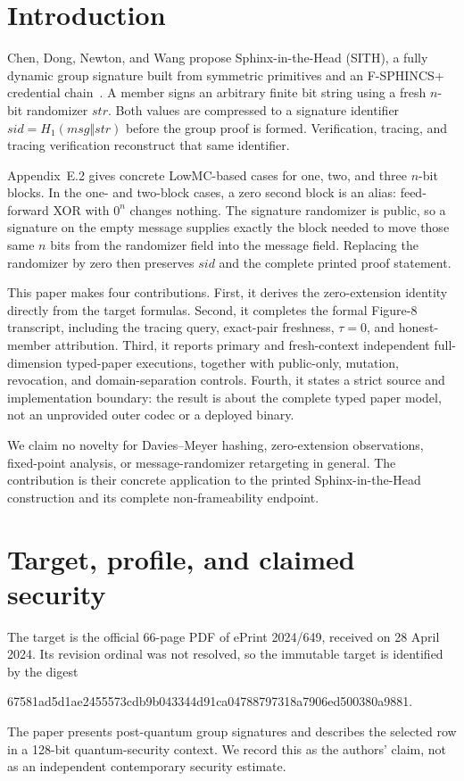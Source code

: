 \documentclass[10pt,a4paper]{article}
\newcommand{\Hone}{H_1}
\newcommand{\sid}{\mathit{sid}}
\newcommand{\strr}{\mathit{str}}
\newcommand{\msg}{\mathit{msg}}
\begin{document}
\section{Introduction}

Chen, Dong, Newton, and Wang propose Sphinx-in-the-Head (SITH), a fully
dynamic group signature built from symmetric primitives and an F-SPHINCS+
credential chain~\cite{chen2024}. A member signs an arbitrary finite bit string
using a fresh $n$-bit randomizer $\strr$. Both values are compressed to a
signature identifier $\sid=\Hone(\msg\Vert\strr)$ before the group proof is
formed. Verification, tracing, and tracing verification reconstruct that same
identifier.

Appendix~E.2 gives concrete LowMC-based cases for one, two, and three
$n$-bit blocks. In the one- and two-block cases, a zero second block is an
alias: feed-forward XOR with $0^n$ changes nothing. The signature randomizer
is public, so a signature on the empty message supplies exactly the block
needed to move those same $n$ bits from the randomizer field into the message
field. Replacing the randomizer by zero then preserves $\sid$ and the complete
printed proof statement.

This paper makes four contributions. First, it derives the zero-extension
identity directly from the target formulas. Second, it completes the formal
Figure-8 transcript, including the tracing query, exact-pair freshness,
$\tau=0$, and honest-member attribution. Third, it reports primary and
fresh-context independent full-dimension typed-paper executions, together
with public-only, mutation, revocation, and domain-separation controls.
Fourth, it states a strict source and implementation boundary: the result is
about the complete typed paper model, not an unprovided outer codec or a
deployed binary.

We claim no novelty for Davies--Meyer hashing, zero-extension observations,
fixed-point analysis, or message-randomizer retargeting in general. The
contribution is their concrete application to the printed
Sphinx-in-the-Head construction and its complete non-frameability endpoint.

\section{Target, profile, and claimed security}

The target is the official 66-page PDF of ePrint 2024/649, received on
28 April 2024. Its revision ordinal was not resolved, so the immutable target
is identified by the digest
\begin{center}
\small\ttfamily
67581ad5d1ae2455573cdb9b043344d91ca04788797318a7906ed500380a9881.
\end{center}
The paper presents post-quantum group signatures and describes the selected
row in a 128-bit quantum-security context. We record this as the authors'
claim, not as an independent contemporary security estimate.
\end{document}
